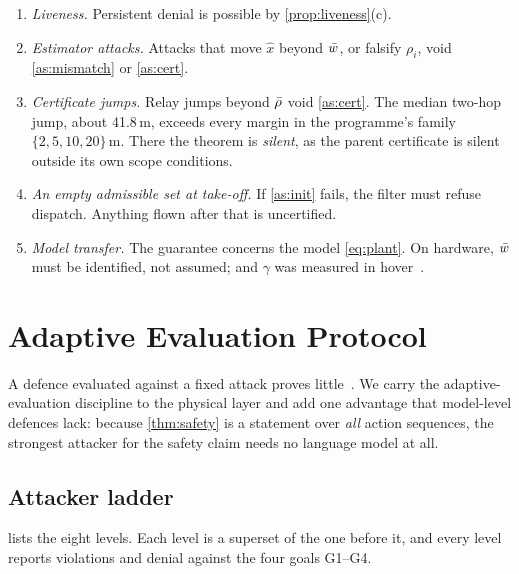\begin{remark}\label{rem:notguaranteed}
\begin{enumerate}[label=(\roman*)]
\item \emph{Liveness.} Persistent denial is possible by
  \cref{prop:liveness}(c).
\item \emph{Estimator attacks.} Attacks that move $\hat x$ beyond $\bar w$, or
  falsify $\rho_i$, void \cref{as:mismatch} or \cref{as:cert}.
\item \emph{Certificate jumps.} Relay jumps beyond $\bar\rho$ void
  \cref{as:cert}. The median two-hop jump, about 41.8\,m, exceeds every
  margin in the programme's family $\{2,5,10,20\}$\,m. There the theorem is
  \emph{silent}, as the parent certificate is silent outside its own scope
  conditions.
\item \emph{An empty admissible set at take-off.} If \cref{as:init} fails,
  the filter must refuse dispatch. Anything flown after that is uncertified.
\item \emph{Model transfer.} The guarantee concerns the model
  \eqref{eq:plant}. On hardware, $\bar w$ must be identified, not assumed; and
  $\gamma$ was measured in hover~\cite{parentpaper}.
\end{enumerate}
\end{remark}

\section{Adaptive Evaluation Protocol}\label{sec:protocol}
A defence evaluated against a fixed attack proves
little~\cite{carlini2017towards,athalye2018obfuscated,tramer2020adaptive,carlini2019evaluating}.
We carry the adaptive-evaluation discipline to the physical layer and add
one advantage that model-level defences lack: because \cref{thm:safety} is a
statement over \emph{all} action sequences, the strongest attacker for the
safety claim needs no language model at all.

\subsection{Attacker ladder}
 lists the eight levels. Each level is a superset of the
one before it, and every level reports violations and denial against the
four goals G1--G4.


